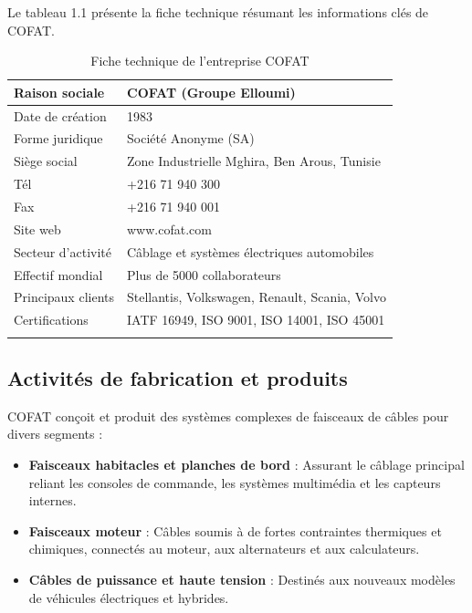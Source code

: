 Le tableau 1.1 présente la fiche technique résumant les informations clés de COFAT.

\begin{longtable}{|m{4cm}|m{8cm}|}
    \hline 
    \textbf{Raison sociale} & \textbf{COFAT (Groupe Elloumi)}\\
    \hline
    Date de création & 1983 \\
    \hline
    Forme juridique & Société Anonyme (SA) \\
    \hline
    Siège social & Zone Industrielle Mghira, Ben Arous, Tunisie \\
    \hline
    Tél & +216 71 940 300 \\
    \hline
    Fax & +216 71 940 001 \\
    \hline
    Site web & www.cofat.com \\
    \hline
    Secteur d'activité & Câblage et systèmes électriques automobiles \\
    \hline
    Effectif mondial & Plus de 5000 collaborateurs \\
    \hline
    Principaux clients & Stellantis, Volkswagen, Renault, Scania, Volvo \\
    \hline
    Certifications & IATF 16949, ISO 9001, ISO 14001, ISO 45001 \\
    \hline
    \captionsetup{justification=centering,margin=2cm}
    \caption{Fiche technique de l'entreprise COFAT}
\end{longtable}

\subsection{Activités de fabrication et produits}

COFAT conçoit et produit des systèmes complexes de faisceaux de câbles pour divers segments :
\begin{itemize}[label=\textbullet]
    \item \textbf{Faisceaux habitacles et planches de bord} : Assurant le câblage principal reliant les consoles de commande, les systèmes multimédia et les capteurs internes.
    \item \textbf{Faisceaux moteur} : Câbles soumis à de fortes contraintes thermiques et chimiques, connectés au moteur, aux alternateurs et aux calculateurs.
    \item \textbf{Câbles de puissance et haute tension} : Destinés aux nouveaux modèles de véhicules électriques et hybrides.
\end{itemize}

